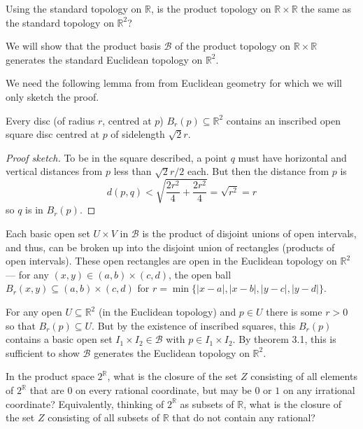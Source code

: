 \documentclass[12 pt, letterpaper]{hmcpset}
\begin{document}
\begin{problem}[3.36]
	Using the standard topology on $\mathbb{R}$, is the product topology on $\mathbb{R} \times \mathbb{R}$ the same as the standard topology on $\mathbb{R}^{2}$?
\end{problem}

\begin{solution}
	We will show that the product basis $\mathcal{B}$ of the product topology on $\mathbb{R} \times \mathbb{R}$ generates the standard Euclidean topology on $\mathbb{R}^{2}$.

	We need the following lemma from from Euclidean geometry for which we will only sketch the proof.
	\begin{lemma}
		Every disc (of radius $r$, centred at $p$) $B_{r}(p) \subseteq \mathbb{R}^{2}$ contains an inscribed open square disc centred at $p$ of sidelength $\sqrt{2} r$.
	\end{lemma}
	\begin{proof}[Proof sketch]
		To be in the square described, a point $q$ must have horizontal and vertical distances from $p$ less than $\sqrt{2} r / 2$ each. But then the distance from $p$ is
		 \[
			d(p, q) < \sqrt{\frac{2r^{2}}{4} + \frac{2r^{2}}{4}} = \sqrt{r^{2}} = r
		\]
		so $q$ is in $B_{r}(p)$.
	\end{proof}

	Each basic open set $U \times V$ in $\mathcal{B}$ is the product of disjoint unions of open intervals, and thus, can be broken up into the disjoint union of rectangles (products of open intervals). These open rectangles are open in the Euclidean topology on $\mathbb{R}^{2}$ --- for any $(x, y) \in (a, b) \times (c, d)$, the open ball  $B_{r}(x, y) \subseteq (a, b) \times (c, d)$ for $r = \min \{ \lvert x - a \rvert, \lvert x - b \rvert, \lvert y - c \rvert, \lvert y - d \rvert \}$.

	For any open $U \subseteq \mathbb{R}^{2}$ (in the Euclidean topology) and $p \in U$ there is some $r > 0$ so that $B_{r}(p) \subseteq U$. But by the existence of inscribed squares, this $B_{r}(p)$ contains a basic open set $I_{1} \times I_{2} \in \mathcal{B}$ with $p \in I_{1} \times I_{2}$. By theorem 3.1, this is sufficient to show $\mathcal{B}$ generates the Euclidean topology on $\mathbb{R}^{2}$.
\end{solution}

\pagebreak

\begin{problem}[3.39]
	In the product space $2^{\mathbb{R}}$, what is the closure of the set $Z$ consisting of all elements of $2^{\mathbb{R}}$ that are $0$ on every rational coordinate, but may be $0$ or $1$ on any irrational coordinate? Equivalently, thinking of $2^{\mathbb{R}}$ as subsets of $\mathbb{R}$, what is the closure of the set $Z$ consisting of all subsets of $\mathbb{R}$ that do not contain any rational?
\end{problem}
\end{document}
